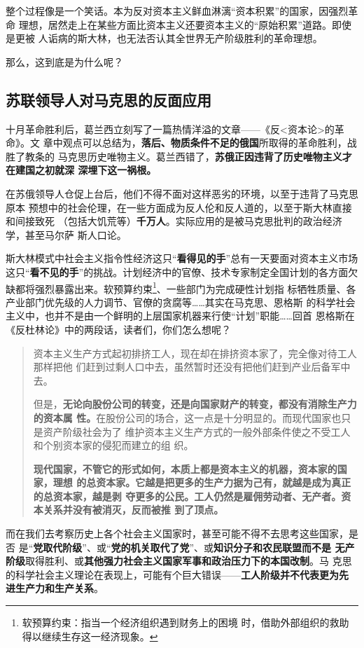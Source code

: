 整个过程像是一个笑话。本为反对资本主义鲜血淋漓“资本积累”的国家，因强烈革命
理想，居然走上在某些方面比资本主义还要资本主义的“原始积累”道路。即使是更被
人诟病的斯大林，也无法否认其全世界无产阶级胜利的革命理想。

那么，这到底是为什么呢？

\subsection{苏联领导人对马克思的反面应用}
\label{sec:beili}


十月革命胜利后，葛兰西立刻写了一篇热情洋溢的文章——《反<资本论>的革命》。文
章中观点可以总结为，\textbf{落后、物质条件不足的俄国}所取得的革命胜利，战胜了教条的
马克思历史唯物主义。葛兰西错了，\textbf{苏俄正因违背了历史唯物主义才在建国之初就深
  深埋下这一祸根。}

在苏俄领导人仓促上台后，他们不得不面对这样恶劣的环境，以至于违背了马克思原本
预想中的社会伦理，在一些方面成为反人伦和反人道的，以至于斯大林直接和间接致死
（包括大饥荒等）\textbf{千万人}。实际应用的是被马克思批判的政治经济学，甚至马尔萨
斯人口论。

斯大林模式中社会主义指令性经济这只“\textbf{看得见的手}”总有一天要面对资本主义市场
这只“\textbf{看不见的手}”的挑战。计划经济中的官僚、技术专家制定全国计划的各方面欠
缺都将强烈暴露出来。软预算约束\footnote{软预算约束：指当一个经济组织遇到财务上的困境
  时，借助外部组织的救助得以继续生存这一经济现象。}、一些部门为完成硬性计划指
标牺牲质量、各产业部门优先级的人力调节、官僚的贪腐等……其实在马克思、恩格斯
的科学社会主义中，也并不是由一个鲜明的上层国家机器来行使“计划”职能……回首
恩格斯在《反杜林论》中的两段话，读者们，你们怎么想呢？
\begin{quotation}
  资本主义生产方式起初排挤工人，现在却在排挤资本家了，完全像对待工人那样把他
  们赶到过剩人口中去，虽然暂时还没有把他们赶到产业后备军中去。

  但是，\textbf{无论向股份公司的转变，还是向国家财产的转变，都没有消除生产力的资本属
  性。}在股份公司的场合，这一点是十分明显的。而现代国家也只是资产阶级社会为了
  维护资本主义生产方式的一般外部条件使之不受工人和个别资本家的侵犯而建立的组
  织。

  \textbf{现代国家，不管它的形式如何，本质上都是资本主义的机器，资本家的国家，理想
  的总资本家。它越是把更多的生产力据为己有，就越是成为真正的总资本家，越是剥
  夺更多的公民。工人仍然是雇佣劳动者、无产者。资本关系并没有被消灭，反而被推
  到了顶点。}
\end{quotation}

而在我们去考察历史上各个社会主义国家时，甚至可能不得不去思考这些国家，是否
是“\textbf{党取代阶级}”、或“\textbf{党的机关取代了党}”、或\textbf{知识分子和农民联盟而不是
  无产阶级}取得胜利、或\textbf{其他强力社会主义国家军事和政治压力下的本国改制}。马
克思的科学社会主义理论在表现上，可能有个巨大错误——\textbf{工人阶级并不代表更为先
  进生产力和生产关系}。

